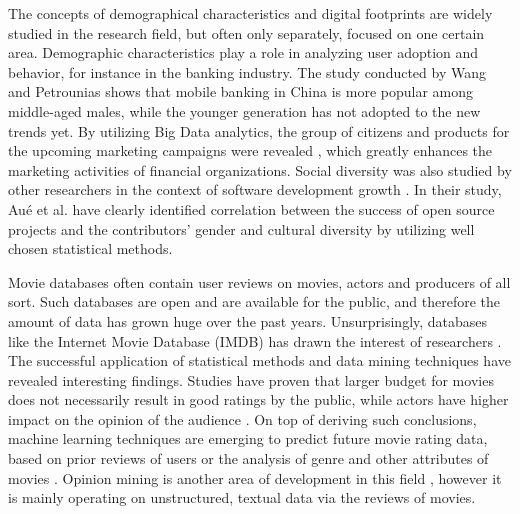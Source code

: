 The concepts of demographical characteristics and digital footprints are widely studied in the research field, but often only separately, focused on one certain area. Demographic characteristics play a role in analyzing user adoption and behavior, for instance in the banking industry. The study conducted by Wang and Petrounias \cite{chinesemobilebankingusers} shows that mobile banking in China is more popular among middle-aged males, while the younger generation has not adopted to the new trends yet. By utilizing Big Data analytics, the group of citizens and products for the upcoming marketing campaigns were revealed \cite{chinesemobilebankingusers}, which greatly enhances the marketing activities of financial organizations. Social diversity was also studied by other researchers in the context of software development growth \cite{socialdiversityongithub}. In their study, Au\'e et al. \cite{socialdiversityongithub} have clearly identified correlation between the success of open source projects and the contributors' gender and cultural diversity by utilizing well chosen statistical methods.

Movie databases often contain user reviews on movies, actors and producers of all sort. Such databases are open and are available for the public, and therefore the amount of data has grown huge over the past years. Unsurprisingly, databases like the Internet Movie Database (IMDB) has drawn the interest of researchers \cite{saraee2004data, kabinsingha2012movie, sumathi2013performance}. The successful application of statistical methods and data mining techniques have revealed interesting findings. Studies have proven that larger budget for movies does not necessarily result in good ratings by the public, while actors have higher impact on the opinion of the audience \cite{saraee2004data}. On top of deriving such conclusions, machine learning techniques are emerging to predict future movie rating data, based on prior reviews of users \cite{saraee2004data} or the analysis of genre and other attributes of movies \cite{kabinsingha2012movie}. Opinion mining is another area of development in this field \cite{sumathi2013performance}, however it is mainly operating on unstructured, textual data via the reviews of movies. 

